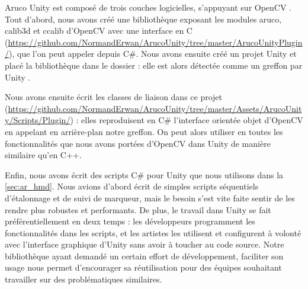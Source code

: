 
Aruco Unity est composé de trois couches logicielles, s'appuyant sur OpenCV . Tout d'abord, nous avons créé une bibliothèque exposant les modules aruco, calib3d et ccalib d'OpenCV avec une interface en C (\url{https://github.com/NormandErwan/ArucoUnity/tree/master/ArucoUnityPlugin/}), que l'on peut appeler depuis C\#. Nous avons ensuite créé un projet Unity et placé la bibliothèque dans le dossier  : elle est alors détectée comme un greffon par Unity .


Nous avons ensuite écrit les classes de liaison dans ce projet (\url{https://github.com/NormandErwan/ArucoUnity/tree/master/Assets/ArucoUnity/Scripts/Plugin/})  : elles reproduisent en C\# l'interface orientée objet d'OpenCV en appelant en arrière-plan notre greffon. On peut alors utiliser en toutes les fonctionnalités que nous avons portées d'OpenCV dans Unity de manière similaire qu'en C++.

Enfin, nous avons écrit des scripts C\# pour Unity que nous utilisons dans la \autoref{sec:ar_hmd}. Nous avions d'abord écrit de simples scripts séquentiels d'étalonnage et de suivi de marqueur, mais le besoin s'est vite faite sentir de les rendre plus robustes et performants. De plus, le travail dans Unity se fait préférentiellement en deux temps : les développeurs programment les fonctionnalités dans les scripts, et les artistes les utilisent et configurent à volonté avec l'interface graphique d'Unity sans avoir à toucher au code source. Notre bibliothèque ayant demandé un certain effort de développement, faciliter son usage nous permet d'encourager sa réutilisation pour des équipes souhaitant travailler sur des problématiques similaires.

